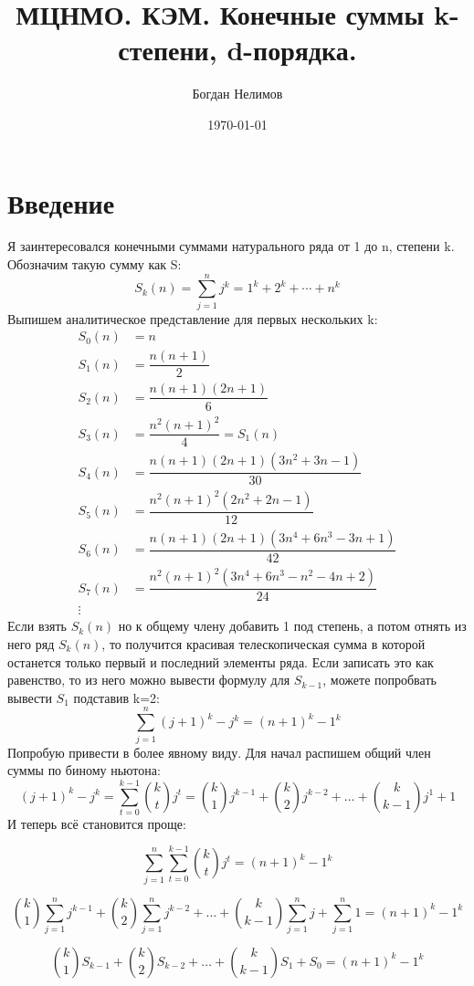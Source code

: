 \documentclass{article} %
\title{МЦНМО. КЭМ. Конечные суммы k-степени, d-порядка.}
\author{Богдан Нелимов}
\date{\today}
\begin{document}
	
	\maketitle
	\newpage
	
	\section{Введение}{Я заинтересовался конечными суммами натурального ряда от 1 до n, степени k. Обозначим такую сумму как S: 
		$$S_k(n) = \sum_{j=1}^{n}j^k = 1^k + 2^k + \cdots + n^k$$
		Выпишем аналитическое представление для первых нескольких k:
		\begin{align*}
			S_0(n) &= n\\
			S_1(n) &= \dfrac{n(n+1)}{2}\\
			S_2(n) &= \dfrac{n(n+1)(2n+1)}{6}\\
			S_3(n) &= \dfrac{n^2(n+1)^2}{4} = S_1(n)\\
			S_4(n) &= \dfrac{n(n+1)(2n+1)(3n^2 + 3n - 1)}{30}\\
			S_5(n) &= \dfrac{n^2(n+1)^2(2n^2+2n-1)}{12}\\
			S_6(n) &= \dfrac{n(n+1)(2n+1)(3n^4+6n^3-3n+1)}{42}\\
			S_7(n) &= \dfrac{n^2(n+1)^2(3n^4+6n^3-n^2-4n+2)}{24}\\
			\vdots
		\end{align*}
		Если взять $S_k(n)$ но к общему члену добавить 1 под степень, а потом отнять из него ряд $S_k(n)$, то получится красивая телескопическая сумма в которой останется только первый и последний элементы ряда. Если записать это как равенство, то из него можно вывести формулу для $S_{k-1}$, можете попробвать вывести $S_1$ подставив k=2:
		$$\sum_{j=1}^{n}(j+1)^k - j^k = (n+1)^k - 1^k$$
		Попробую привести в более явному виду. Для начал распишем общий член суммы по биному ньютона:
		$$(j+1)^k - j^k = \sum_{t=0}^{k-1}{{k}\choose{t}}j^t = {{k}\choose{1}}j^{k-1} + {{k}\choose{2}}j^{k-2} + \ldots + {{k}\choose{k-1}}j^{1} + 1$$
		И теперь всё становится проще:
		
		$$\sum_{j=1}^{n}\sum_{t=0}^{k-1}{{k}\choose{t}}j^t = (n+1)^k - 1^k$$
		
		$${{k}\choose{1}}\sum_{j=1}^{n}j^{k-1} + {{k}\choose{2}}\sum_{j=1}^{n}j^{k-2} + \ldots + {{k}\choose{k-1}}\sum_{j=1}^{n}j + \sum_{j=1}^{n}1 = (n+1)^k - 1^k$$
		
		$${{k}\choose{1}}S_{k-1} + {{k}\choose{2}}S_{k-2} + \ldots + {{k}\choose{k-1}}S_{1} + S_{0} = (n+1)^k - 1^k$$
		
}
\end{document}
